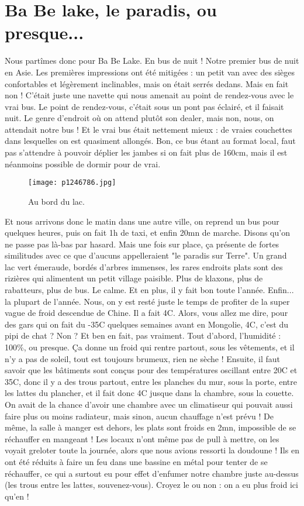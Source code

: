 \documentclass{book}
\begin{document}
\chapter{Ba Be lake, le paradis, ou presque...}
Nous partîmes donc pour Ba Be Lake. En bus de nuit ! Notre premier bus de nuit en Asie. Les premières impressions ont été mitigées : un petit van avec des sièges confortables et légèrement inclinables, mais on était serrés dedans. Mais en fait non ! C'était juste une navette qui nous amenait au point de rendez-vous avec le vrai bus. Le point de rendez-vous, c'était sous un pont pas éclairé, et il faisait nuit. Le genre d'endroit où on attend plutôt son dealer, mais non, nous, on attendait notre bus ! Et le vrai bus était nettement mieux : de vraies couchettes dans lesquelles on est quasiment allongés. Bon, ce bus étant au format local, faut pas s'attendre à pouvoir déplier les jambes si on fait plus de 160cm, mais il est néanmoins possible de dormir pour de vrai.


\begin{figure}[h]
\centering
\texttt{[image: p1246786.jpg]}
\caption*{Au bord du lac.}
\end{figure}

Et nous arrivons donc le matin dans une autre ville, on reprend un bus pour quelques heures, puis on fait 1h de taxi, et enfin 20mn de marche. Disons qu'on ne passe pas là-bas par hasard. Mais une fois sur place, ça présente de fortes similitudes avec ce que d'aucuns appelleraient "le paradis sur Terre". Un grand lac vert émeraude, bordés d'arbres immenses, les rares endroits plats sont des rizières qui alimentent un petit village paisible. Plus de klaxons, plus de rabatteurs, plus de bus. Le calme. Et en plus, il y fait bon toute l'année. Enfin... la plupart de l'année. Nous, on y est resté juste le temps de profiter de la super vague de froid descendue de Chine. Il a fait 4\textdegree C. Alors, vous allez me dire, pour des gars qui on fait du -35\textdegree C quelques semaines avant en Mongolie, 4\textdegree C, c'est du pipi de chat ? Non ? Et ben en fait, pas vraiment. Tout d'abord, l'humidité : 100\%, ou presque. Ça donne un froid qui rentre partout, sous les vêtements, et il n'y a pas de soleil, tout est toujours brumeux, rien ne sèche ! Ensuite, il faut savoir que les bâtiments sont conçus pour des températures oscillant entre 20\textdegree C et 35\textdegree C, donc il y a des trous partout, entre les planches du mur, sous la porte, entre les lattes du plancher, et il fait donc 4\textdegree C jusque dans la chambre, sous la couette. On avait de la chance d'avoir une chambre avec un climatiseur qui pouvait aussi faire plus ou moins radiateur, mais sinon, aucun chauffage n'est prévu ! De même, la salle à manger est dehors, les plats sont froids en 2mn, impossible de se réchauffer en mangeant ! Les locaux n'ont même pas de pull à mettre, on les voyait greloter toute la journée, alors que nous avions ressorti la doudoune ! Ils en ont été réduits à faire un feu dans une bassine en métal pour tenter de se réchauffer, ce qui a surtout eu pour effet d'enfumer notre chambre juste au-dessus (les trous entre les lattes, souvenez-vous). Croyez le ou non : on a eu plus froid ici qu'en  !
\end{document}
